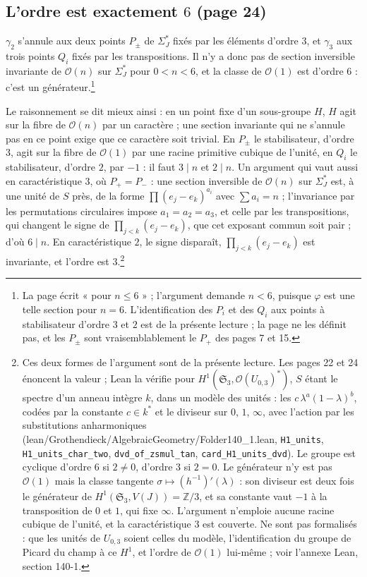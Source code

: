 \documentclass[11pt,a4paper]{article}
\begin{document}
\subsection*{L'ordre est exactement $6$ (page 24)}

$\gamma_2$ s'annule aux deux points $P_\pm$ de $\Sigma_J^{*}$ fixés par les
éléments d'ordre $3$, et $\gamma_3$ aux trois points $Q_i$ fixés par les
transpositions. Il n'y a donc pas de section inversible invariante de
$\mathcal{O}(n)$ sur $\Sigma_J^{*}$ pour $0 < n < 6$, et la classe de
$\mathcal{O}(1)$ est d'ordre $6$ : c'est un générateur.\footnote{La page écrit
« pour $n \leqslant 6$ » ; l'argument demande $n < 6$, puisque $\varphi$ est une
telle section pour $n = 6$. L'identification des $P_i$ et des $Q_i$ aux points à
stabilisateur d'ordre $3$ et $2$ est de la présente lecture ; la page ne les
définit pas, et les $P_\pm$ sont vraisemblablement le $P_+$ des pages 7 et 15.}

Le raisonnement se dit mieux ainsi : en un point fixe d'un sous-groupe $H$, $H$
agit sur la fibre de $\mathcal{O}(n)$ par un caractère ; une section invariante
qui ne s'annule pas en ce point exige que ce caractère soit trivial. En $P_\pm$ le
stabilisateur, d'ordre $3$, agit sur la fibre de $\mathcal{O}(1)$ par une racine
primitive cubique de l'unité, en $Q_i$ le stabilisateur, d'ordre $2$, par $-1$ :
il faut $3 \mid n$ et $2 \mid n$. Un argument qui vaut aussi en caractéristique
$3$, où $P_+ = P_-$ : une section inversible de $\mathcal{O}(n)$ sur
$\Sigma_J^{*}$ est, à une unité de $S$ près, de la forme
$\prod (e_j - e_k)^{a_i}$ avec $\sum a_i = n$ ; l'invariance par les
permutations circulaires impose $a_1 = a_2 = a_3$, et celle par les
transpositions, qui changent le signe de $\prod_{j<k}(e_j - e_k)$, que cet
exposant commun soit pair ; d'où $6 \mid n$. En caractéristique $2$, le signe
disparaît, $\prod_{j<k}(e_j - e_k)$ est invariante, et l'ordre est $3$.\footnote{Ces
deux formes de l'argument sont de la présente lecture. Les pages 22 et 24
énoncent la valeur ; Lean la vérifie pour $H^1(\mathfrak{S}_3,
\mathcal{O}(U_{0,3})^{*})$, $S$ étant le spectre d'un anneau intègre $k$, dans
un modèle des unités : les $c\,\lambda^a(1-\lambda)^b$, codées par la
constante $c \in k^{*}$ et le diviseur sur $0$, $1$, $\infty$, avec l'action
par les substitutions anharmoniques (lean/Grothendieck/AlgebraicGeometry/Folder140\_1.lean,
\texttt{H1\_units}, \texttt{H1\_units\_char\_two},
\texttt{dvd\_of\_zsmul\_tan}, \texttt{card\_H1\_units\_dvd}). Le groupe est
cyclique d'ordre $6$ si $2 \neq 0$, d'ordre $3$ si $2 = 0$. Le générateur
n'y est pas $\mathcal{O}(1)$ mais la classe tangente $\sigma \mapsto
(h^{-1})'(\lambda)$ : son diviseur est deux fois le générateur de
$H^1(\mathfrak{S}_3, V(J)) = \mathbb{Z}/3$, et sa constante vaut $-1$ à la
transposition de $0$ et $1$, qui fixe $\infty$. L'argument n'emploie aucune
racine cubique de l'unité, et la caractéristique $3$ est couverte. Ne sont pas
formalisés : que les unités de $U_{0,3}$ soient celles du modèle,
l'identification du groupe de Picard du champ à ce $H^1$, et l'ordre de
$\mathcal{O}(1)$ lui-même ; voir l'annexe Lean, section 140-1.}
\end{document}
